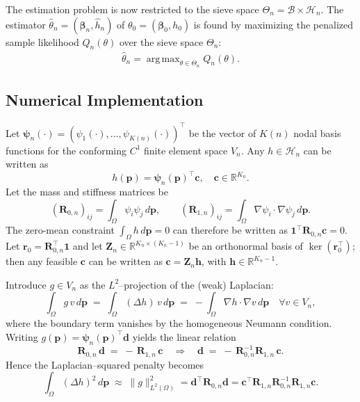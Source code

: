 \documentclass[11pt]{article}
\DeclareMathOperator*{\argmax}{arg\,max}
\begin{document}
The estimation problem is now restricted to the sieve space $\Theta_n = \mathcal{B} \times \mathcal{H}_n$. The estimator $\hat \theta_n = (\hat{\bm \beta}_n, \hat h_n)$ of $\theta_0 = (\bm\beta_0,h_0)$ is found by maximizing the penalized sample likelihood $Q_n(\theta)$ over the sieve space $\Theta_n$:
\begin{align}\label{eq:estimator1}
	\hat \theta_n = \argmax_{\theta \in \Theta_n} Q_n(\theta).
\end{align}


\subsection{Numerical Implementation}\label{sec:implementation}

Let $\bm{\psi}_n(\cdot) = (\psi_1(\cdot), \dots, \psi_{K(n)}(\cdot))^\top$ be the vector of $K(n)$ nodal basis functions for the conforming $C^1$ finite element space $V_n$. Any $h \in \mathcal{H}_n$ can be written as
\[
h(\bm p) = \bm{\psi}_n(\bm p)^\top \mathbf c,\quad \mathbf c \in \mathbb R^{K_n}.
\]
Let the mass and stiffness matrices be
\[
(\mathbf R_{0,n})_{ij}=\int_\Omega \psi_i\psi_j\,d\bm p,
\qquad
(\mathbf R_{1,n})_{ij}=\int_\Omega \nabla\psi_i\cdot\nabla\psi_j\,d\bm p.
\]
The zero-mean constraint $\int_\Omega h\,d\bm p=0$ can therefore be written as $\mathbf 1^\top \mathbf R_{0,n}\mathbf c=0$.
Let $\mathbf r_0=\mathbf R_{0,n}^\top\mathbf 1$ and let $\mathbf Z_n\in\mathbb R^{K_n\times(K_n-1)}$ be an orthonormal basis of $\ker(\mathbf r_0^\top)$; then any feasible $\mathbf c$ can be written as $\mathbf c=\mathbf Z_n\mathbf h$, with $\mathbf h\in\mathbb R^{K_n-1}$.

Introduce $g\in V_n$ as the $L^2$–projection of the (weak) Laplacian:
\[
\int_\Omega g\,v\,d\bm p \;=\; \int_\Omega (\Delta h)\,v\,d\bm p
\;=\; -\int_\Omega \nabla h\cdot\nabla v\,d\bm p
\quad\forall v\in V_n,
\]
where the boundary term vanishes by the homogeneous Neumann condition.  
Writing $g(\bm p)=\bm{\psi}_n(\bm p)^\top \mathbf d$ yields the linear relation
\[
\mathbf R_{0,n}\,\mathbf d \;=\; -\,\mathbf R_{1,n}\,\mathbf c
\quad\Longrightarrow\quad
\mathbf d \;=\; -\,\mathbf R_{0,n}^{-1}\mathbf R_{1,n}\,\mathbf c.
\]
Hence the Laplacian–squared penalty becomes
\[
\int_\Omega (\Delta h)^2\,d\bm p \;\approx\; \|g\|_{L^2(\Omega)}^2
= \mathbf d^\top \mathbf R_{0,n}\mathbf d
= \mathbf c^\top \mathbf R_{1,n}\mathbf R_{0,n}^{-1}\mathbf R_{1,n}\mathbf c.
\]
\end{document}
